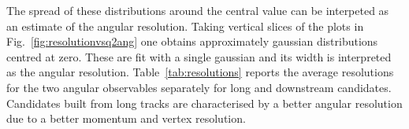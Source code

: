 %
%
The spread of these distributions around the central value can be interpeted as an estimate of the angular resolution.
Taking vertical slices of the plots in Fig.~\ref{fig:resolutionvsq2ang} one obtains approximately gaussian
distributions centred at zero. These are fit with a single gaussian and its width
is interpreted as the angular resolution. Table~\ref{tab:resolutions} reports the average resolutions
for the two angular observables separately for long and downstream candidates. Candidates built
from long tracks are characterised by a better angular resolution due to a better momentum and vertex resolution.
%
%


